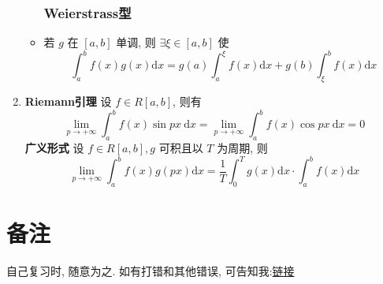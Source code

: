 \documentclass{article}
\begin{document}
\begin{enumerate}
\begin{itemize}
				\subsubsection*{Weierstrass型}
				\item 若 $g$ 在 $[a, b]$ 单调, 则 $\exists \xi \in[a, b]$ 使
				$$
				\int_{a}^{b} f(x) g(x) \mathrm{d} x=g(a) \int_{a}^{\xi} f(x) \mathrm{d} x+g(b) \int_{\xi}^{b} f(x) \mathrm{d} x
				$$
			\end{itemize}
			\item \textbf{Riemann引理}
			设 $f \in R[a, b]$, 则有
			$$
			\lim _{p \rightarrow+\infty} \int_{a}^{b} f(x) \sin p x \mathrm{~d} x=\lim _{p \rightarrow+\infty} \int_{a}^{b} f(x) \cos p x \mathrm{~d} x=0
			$$
			\textbf{广义形式} 设 $f \in R[a, b], g$ 可积且以 $T$ 为周期, 则
			$$
			\lim _{p \rightarrow+\infty} \int_{a}^{b} f(x) g(p x) \mathrm{d} x=\frac{1}{T} \int_{0}^{T} g(x) \mathrm{d} x \cdot \int_{a}^{b} f(x) \mathrm{d} x
			$$
		\end{enumerate}
	\section{备注}
		自己复习时, 随意为之.
		如有打错和其他错误, 可告知我:\href{mailto:wangkailing151@sjtu.edu.cn}{链接}
\end{document}
